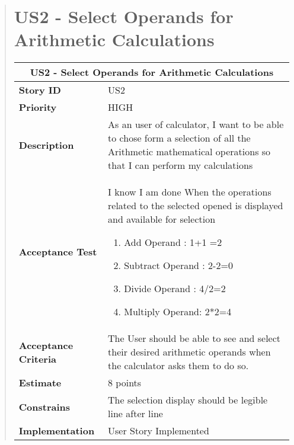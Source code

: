\documentclass[12pt]{report}
\begin{document}
\begin{quote}
        \section{US2 - Select Operands for Arithmetic Calculations}
                \begin{tabular}{ |p{4cm}|p{10cm}| }
                 \hline
                 \multicolumn{2}{|c|}{\textbf{US2 - Select Operands for Arithmetic Calculations}} \\
                 \hline
                 \textbf {Story ID}& US2  \\
                 \hline
                 \textbf{Priority} & HIGH \\
                 \hline
                 \textbf{Description}   &  As an user of calculator, I want to be able to chose form a selection of all the Arithmetic mathematical operations so that I can perform my calculations   \\
                 \hline
                 \textbf{Acceptance Test}&  I know I am done When the operations related to the selected opened is displayed and available for selection
                 \begin{enumerate}
                     \item  Add Operand : 1+1 =2
                     \item  Subtract Operand : 2-2=0
                     \item  Divide Operand : 4/2=2
                     \item Multiply Operand: 2*2=4
                 \end{enumerate}
             \\
                 \hline
                 \textbf{Acceptance Criteria}&The User should be able to see and select their desired arithmetic operands when the calculator asks them to do so.\\
                 \hline
                 \textbf{Estimate} &  8  points  \\
                 \hline
                 \textbf{Constrains}& The selection display should be legible line after line   \\
                 \hline
                         \textbf {Implementation}&User Story Implemented \\
                \hline
                \end{tabular}
            \hfill\break
       

\end{quote}
\end{document}
